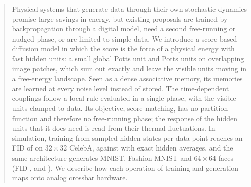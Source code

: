 \documentclass{article}
\begin{document}

\printAffiliationsAndNotice{}

\begin{abstract}
Physical systems that generate data through their own stochastic dynamics
promise large savings in energy, but existing proposals are trained by
backpropagation through a digital model, need a second free-running or nudged
phase, or are limited to simple data.
We introduce a score-based diffusion model in which the score is the force of a
physical energy with fast hidden units: a small global Potts unit and Potts units
on overlapping image patches, which sum out exactly and leave the visible units
moving in a free-energy landscape.
Seen as a dense associative memory, its memories are learned at every noise
level instead of stored.
The time-dependent couplings follow a local rule evaluated in a single phase,
with the visible units clamped to data. Its objective, score matching, has no
partition function and therefore no free-running phase; the response of the
hidden units that it does need is read from their thermal fluctuations.
In simulation, training from \Slarge{} sampled hidden states per data point
reaches an FID of \FIDcelebLowSlarge{} on $32\times32$ CelebA, against
\FIDcelebLowExact{} with exact hidden averages, and the same architecture
generates MNIST, Fashion-MNIST and $64\times64$ faces
(FID \FIDmnistSlarge, \FIDfashionSlarge{} and \FIDcelebHighSlarge).
We describe how each operation of training and generation maps onto analog
crossbar hardware.
\end{abstract}
\end{document}
